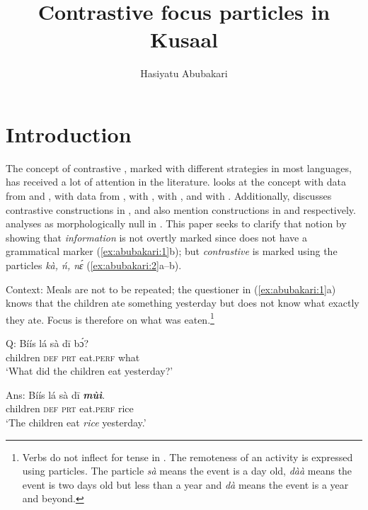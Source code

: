 \documentclass[output=paper,modfonts,nonflat,
\ChapterDOI{10.5281/zenodo.3367154}
 hidelinks
]{langsci/langscibook}
\author{Hasiyatu Abubakari\affiliation{University of Vienna, Austria}}
\title{Contrastive focus particles in Kusaal}
\begin{document}
\maketitle

\section{Introduction}
The concept of contrastive , marked with different strategies in most languages, has received a lot of attention in the literature. \citet{ÉKiss1998} looks at the concept with data from  and , \citet{horn1981} with data from , \citet{szabolcsi1981} with , \citet{hartmann2007} with , and \citet{duah2015} with . Additionally, \citet{hudu2012} discusses contrastive  constructions in , \citet{hiraiwa2005} and \citet{hiraiwabodomo2008} also mention  constructions in  and  respectively. \citet{Abubakari2011} analyses  as morphologically null in . This paper seeks to clarify that notion by showing that \textit{information}  is not overtly marked since  does not have a grammatical  marker (\ref{ex:abubakari:1}b); but \textit{contrastive}  is marked using the particles \textit{kà, ń, nɛ́} (\ref{ex:abubakari:2}a--b). 

Context: Meals are not to be repeated; the questioner in (\ref{ex:abubakari:1}a) knows that the children ate something yesterday but does not know what exactly they ate. Focus is therefore on what was eaten.\footnote{Verbs do not inflect for tense in . The remoteness of an activity is expressed using particles. The particle \textit{sà} means the event is a day old, \textit{dàà} means the event is two days old but less than a year and \textit{dà} means the event is a year and beyond.}

 
\ea\label{ex:abubakari:1}
\ea\label{ex:abubakari:1a}
Q: \gll Bíís    lá  sà dī    bɔ́?\\                 
children  \textsc{def}  \textsc{prt}  eat.\textsc{perf}  what\\                     
\glt ‘What did the children eat yesterday?’    

\ex\label{ex:abubakari:1b}
Ans: \gll Bíís    lá  sà  dī \textbf{\textit{mùì}}.\\
children    \textsc{def}  \textsc{prt}  eat.\textsc{perf}  rice\\
\glt ‘The children eat \textit{rice} yesterday.’  
 \z
 \z
 
\end{document}

